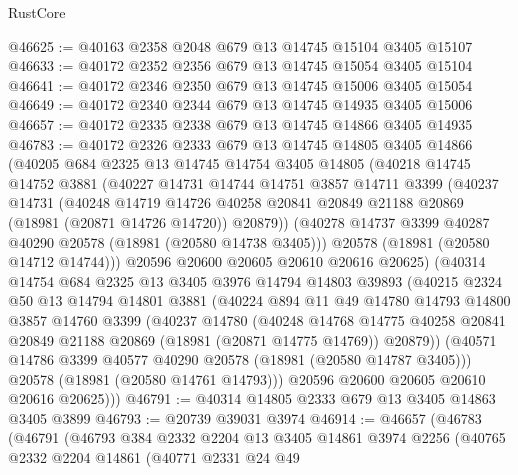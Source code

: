 \begin{lexlean}{RustCore}
\begin{coremodule}
@46625 := @40163 @2358 @2048 @679 @13 @14745 @15104 @3405 @15107
@46633 := @40172 @2352 @2356 @679 @13 @14745 @15054 @3405 @15104
@46641 := @40172 @2346 @2350 @679 @13 @14745 @15006 @3405 @15054
@46649 := @40172 @2340 @2344 @679 @13 @14745 @14935 @3405 @15006
@46657 := @40172 @2335 @2338 @679 @13 @14745 @14866 @3405 @14935
@46783 := @40172
    @2326
    @2333
    @679
    @13
    @14745
    @14805
    @3405
    @14866
    (@40205
      @684
      @2325
      @13
      @14745
      @14754
      @3405
      @14805
      (@40218
        @14745
        @14752
        @3881
        (@40227
          @14731
          @14744
          @14751
          @3857
          @14711
          @3399
          (@40237
            @14731
            (@40248
              @14719
              @14726
              @40258
              @20841
              @20849
              @21188
              @20869
              (@18981 (@20871 @14726 @14720))
              @20879))
          (@40278 @14737 @3399 @40287 @40290 @20578 (@18981 (@20580 @14738 @3405)))
          @20578
          (@18981 (@20580 @14712 @14744)))
        @20596
        @20600
        @20605
        @20610
        @20616
        @20625)
      (@40314
        @14754
        @684
        @2325
        @13
        @3405
        @3976
        @14794
        @14803
        @39893
        (@40215
          @2324
          @50
          @13
          @14794
          @14801
          @3881
          (@40224
            @894
            @11
            @49
            @14780
            @14793
            @14800
            @3857
            @14760
            @3399
            (@40237
              @14780
              (@40248
                @14768
                @14775
                @40258
                @20841
                @20849
                @21188
                @20869
                (@18981 (@20871 @14775 @14769))
                @20879))
            (@40571 @14786 @3399 @40577 @40290 @20578 (@18981 (@20580 @14787 @3405)))
            @20578
            (@18981 (@20580 @14761 @14793)))
          @20596
          @20600
          @20605
          @20610
          @20616
          @20625)))
@46791 := @40314 @14805 @2333 @679 @13 @3405 @14863 @3405 @3899
@46793 := @20739 @39031 @3974
@46914 := @46657
    (@46783
      (@46791
        (@46793
          @384
          @2332
          @2204
          @13
          @3405
          @14861
          @3974
          @2256
          (@40765
            @2332
            @2204
            @14861
            (@40771
              @2331
              @24
              @49

\end{coremodule}
\end{lexlean}
